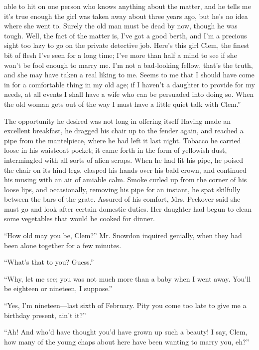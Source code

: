 able to hit on one person who knows anything about the matter, and he
tells me it's true enough the girl was taken away about three years ago,
but he's no idea where she went to. Surely the old man must be dead by
now, though he was tough. Well, the fact of the matter is, I've got a
good berth, and I'm a precious sight too lazy to go on the private
detective job. Here's this girl Clem, the finest bit of flesh I've seen
for a long time; I've more than half a mind to see if she won't be fool
enough to marry {\protect\hypertarget{11}{}{}}me. I'm not a bad-looking
fellow, that's the truth, and she may have taken a real liking to me.
Seems to me that I should have come in for a comfortable thing in my old
age; if I haven't a daughter to provide for my needs, at all events I
shall have a wife who can be persuaded into doing so. When the old woman
gets out of the way I must have a little quiet talk with Clem.''

The opportunity he desired was not long in offering itself Having made
an excellent breakfast, he dragged his chair up to the fender again, and
reached a pipe from the mantelpiece, where he had left it last night.
Tobacco he carried loose in his waistcoat pocket; it came forth in the
form of yellowish dust, intermingled with all sorts of alien scraps.
When he had lit his pipe, he poised the chair on its hind-legs, clasped
his hands over his bald crown, and continued his musing with an air of
amiable calm. Smoke curled up from the corner of his loose lips, and
occasionally, removing his pipe for an instant, he spat skilfully
between the bars {\protect\hypertarget{12}{}{}}of the grate. Assured of
his comfort, Mrs. Peckover said she must go and look after certain
domestic duties. Her daughter had begun to clean some vegetables that
would be cooked for dinner.

``How old may you be, Clem?'' Mr. Snowdon inquired genially, when they
had been alone together for a few minutes.

``What's that to you? Guess.''

``Why, let me see; you was not much more than a baby when I went away.
You'll be eighteen or nineteen, I suppose.''

``Yes, I'm nineteen---last sixth of February. Pity you come too late to
give me a birthday present, ain't it?''

``Ah! And who'd have thought you'd have grown up such a beauty! I say,
Clem, how many of the young chaps about here have been wanting to marry
you, eh?''


